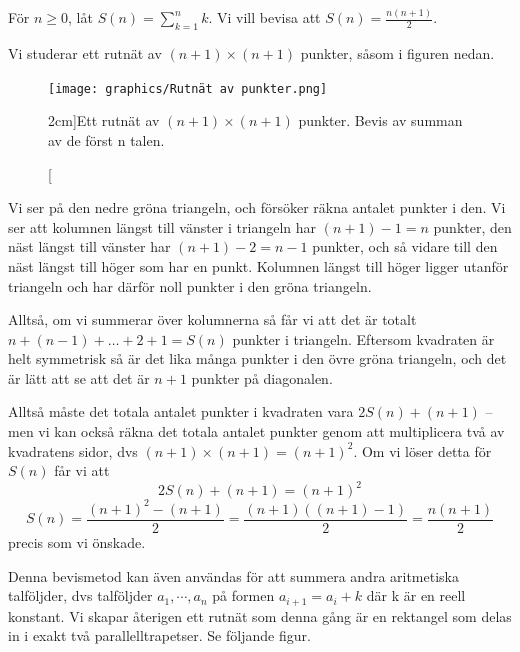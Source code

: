 \documentclass[nobib]{tufte-handout}
\begin{document}
\begin{example}\label{example_triangular_numbers}
  För $n\geq 0$, låt $S(n) = \sum_{k=1}^n k$. Vi vill bevisa att $S(n) = \frac{n(n+1)}{2}$.

  Vi studerar ett rutnät av $(n+1)\times(n+1)$ punkter, såsom i figuren nedan.

  \begin{figure}
    \texttt{[image: graphics/Rutnät av punkter.png]}
    \caption[][2cm]{Ett rutnät av $(n+1)\times(n+1)$ punkter. Bevis av summan av de först n talen.}
  \end{figure}
  
  Vi ser på den nedre gröna triangeln, och försöker räkna antalet punkter i den. Vi ser att kolumnen längst till vänster i triangeln har $(n+1)-1 = n$ punkter, den näst längst till vänster har $(n+1)-2=n-1$ punkter, och så vidare till den näst längst till höger som har en punkt. Kolumnen längst till höger ligger utanför triangeln och har därför noll punkter i den gröna triangeln.

  Alltså, om vi summerar över kolumnerna så får vi att det är totalt $n + (n-1) + \ldots + 2 + 1 = S(n)$ punkter i triangeln. Eftersom kvadraten är helt symmetrisk så är det lika många punkter i den övre gröna triangeln, och det är lätt att se att det är $n+1$ punkter på diagonalen.

  Alltså måste det totala antalet punkter i kvadraten vara $2S(n) + (n+1)$ -- men vi kan också räkna det totala antalet punkter genom att multiplicera två av kvadratens sidor, dvs $(n+1)\times(n+1)=(n+1)^2$. Om vi löser detta för $S(n)$ får vi att
    $$2S(n) + (n+1)=(n+1)^2$$
    $$S(n) = \frac{(n+1)^2 - (n+1)}{2} = \frac{(n+1)((n+1)-1)}{2} = \frac{n(n+1)}{2}$$
  precis som vi önskade.
  
  Denna bevismetod kan även användas för att summera andra aritmetiska talföljder, dvs talföljder $a_{1},\cdots,a_{n}$ på formen $a_{i+1}=a_{i}+k$ där k är en reell konstant. Vi skapar återigen ett rutnät som denna gång är en rektangel som delas in i exakt två parallelltrapetser. Se följande figur. 
  

\end{example}
\end{document}
